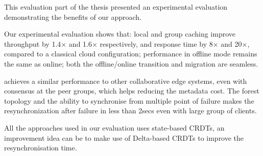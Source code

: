 
This evaluation part of the thesis presented an experimental evaluation 
demonstrating the benefits of our approach.

Our experimental evaluation shows that: 
local and group caching improve throughput by 1.4× and 1.6× respectively, 
and response time by 8× and 20×, compared to a classical cloud configuration; 
performance in offline mode remains the same as online; 
both the offline/online transition and migration are seamless.

\system{} achieves a similar performance to other collaborative edge systems,
even with consensus at the peer groups,
which helps reducing the metadata cost. 
The forest topology and the ability to synchronise from multiple point of failure
makes the resynchronization after failure in less than 2secs even with large 
group of clients.

All the approaches used in our evaluation uses state-based CRDTs,
an improvement idea can be to make use of Delta-based CRDTs \cite{almeida2015efficient}
to improve the resynchronisation time.
